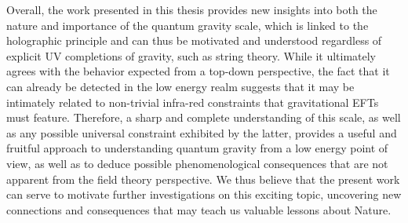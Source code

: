 
Overall, the work presented in this thesis provides new insights into both the nature and importance of the quantum gravity scale, which is linked to the holographic principle and can thus be motivated and understood regardless of explicit UV completions of gravity, such as string theory. While it ultimately agrees with the behavior expected from a top-down perspective, the fact that it can already be detected in the low energy realm suggests that it may be intimately related to non-trivial infra-red constraints that gravitational EFTs must feature. Therefore, a sharp and complete understanding of this scale, as well as any possible universal constraint exhibited by the latter, provides a useful and fruitful approach to understanding quantum gravity from a low energy point of view, as well as to deduce possible phenomenological consequences that are not apparent from the field theory perspective. We thus believe that the present work can serve to motivate further investigations on this exciting topic, uncovering new connections and consequences that may teach us valuable lessons about Nature.

